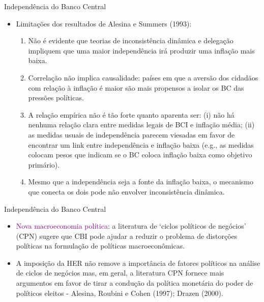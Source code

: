 \documentclass[10pt]{beamer}
\begin{document}
\begin{frame}{Independência do Banco Central}
    \begin{itemize}
        \item Limitações dos resultados de Alesina e Summers (1993):
        \bigskip
        \begin{enumerate}
            \item Não é evidente que teorias de inconsistência dinâmica e delegação impliquem que uma maior independência irá produzir uma inflação mais baixa.
            \bigskip
            \item Correlação não implica causalidade: países em que a aversão dos cidadãos com relação à inflação é maior são mais propensos a isolar os BC das pressões políticas.
            \bigskip
            \item A relação empírica não é tão forte quanto aparenta ser: (i) não há nenhuma relação clara entre medidas legais de BCI e inflação média; (ii) as medidas usuais de independência parecem viesadas em favor de encontrar um link entre independência e inflação baixa (e.g., as medidas colocam pesos que indicam se o BC coloca inflação baixa como objetivo primário).
            \bigskip
            \item Mesmo que a independência seja a fonte da inflação baixa, o mecanismo que conecta os dois pode não envolver inconsistência dinâmica.
        \end{enumerate}
    \end{itemize}
\end{frame}

\begin{frame}{Independência do Banco Central}
    \begin{itemize}
        \item \textcolor{purple}{Nova macroeconomia política}: a literatura de `ciclos políticos de negócios' (CPN) sugere que CBI pode ajudar a reduzir o problema de distorções políticas na formulação de políticas macroeconômicas.
        \bigskip
        \item A imposição da HER não remove a importância de fatores políticos na análise de ciclos de negócios mas, em geral, a literatura CPN fornece mais argumentos em favor de tirar a condução da política monetária do poder de políticos eleitos - Alesina, Roubini e Cohen (1997); Drazen (2000).
    \end{itemize}
\end{frame}
\end{document}
